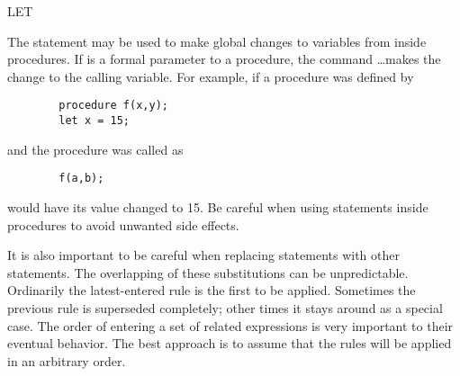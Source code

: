 \begin{Command}{LET}
\begin{Comments}
The  statement may be used to make global changes to variables from
inside procedures.  If  is a formal parameter to a procedure, the 
command \ldots makes the change to the calling variable.  
For example, if a procedure was defined by 
\begin{verbatim}
        procedure f(x,y);
        let x = 15;
\end{verbatim}
and the procedure was called as
\begin{verbatim}
        f(a,b);
\end{verbatim}
 would have its value changed to 15.  Be careful when using 
statements inside procedures to avoid unwanted side effects.

It is also important to be careful when replacing  statements with
other  statements.  The overlapping of these substitutions can be
unpredictable.  Ordinarily the latest-entered rule is the first to be applied.
Sometimes the previous rule is superseded completely; other times it stays
around as a special case.  The order of entering a set of related 
expressions is very important to their eventual behavior.  The best
approach is to assume that the rules will be applied in an arbitrary order.
\end{Comments}
\end{Command}


